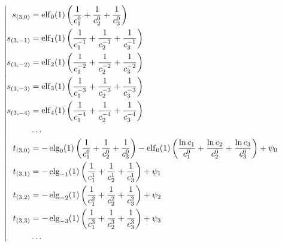 \begin{equation*} \left| \begin{aligned}
s_{(3,0)} &=
  \elf_0(1) \left(
  \frac{1}{c_1^0}
+ \frac{1}{c_2^0}
+ \frac{1}{c_3^0} \right) \\
%
s_{(3,-1)} &=
  \elf_1(1) \left(
  \frac{1}{c_1^{-1}}
+ \frac{1}{c_2^{-1}}
+ \frac{1}{c_3^{-1}} \right) \\
%
s_{(3,-2)} &=
  \elf_2(1) \left(
  \frac{1}{c_1^{-2}}
+ \frac{1}{c_2^{-2}}
+ \frac{1}{c_3^{-2}} \right) \\
%
s_{(3,-3)} &=
  \elf_3(1) \left(
  \frac{1}{c_1^{-3}}
+ \frac{1}{c_2^{-3}}
+ \frac{1}{c_3^{-3}} \right) \\
%
s_{(3,-4)} &=
  \elf_4(1) \left(
  \frac{1}{c_1^{-4}}
+ \frac{1}{c_2^{-4}}
+ \frac{1}{c_3^{-4}} \right) \\
%
&\ldots \\
%
t_{(3,0)} &=
- \elg_0(1) \left(
  \frac{1}{c_1^0}
+ \frac{1}{c_2^0}
+ \frac{1}{c_3^0} \right)
- \elf_0(1) \left(
  \frac{\ln{c_1}}{c_1^0}
+ \frac{\ln{c_2}}{c_2^0}
+ \frac{\ln{c_3}}{c_3^0} \right)
+ \psi_0 \\
%
t_{(3,1)} &=
- \elg_{-1}(1) \left(
  \frac{1}{c_1^1}
+ \frac{1}{c_2^1}
+ \frac{1}{c_3^1} \right)
+ \psi_1 \\
%
t_{(3,2)} &=
- \elg_{-2}(1) \left(
  \frac{1}{c_1^2}
+ \frac{1}{c_2^2}
+ \frac{1}{c_3^2} \right)
+ \psi_2 \\
%
t_{(3,3)} &=
- \elg_{-3}(1) \left(
  \frac{1}{c_1^3}
+ \frac{1}{c_2^3}
+ \frac{1}{c_3^3} \right)
+ \psi_3 \\
%
&\ldots \\
\end{aligned} \right. \end{equation*}
%

